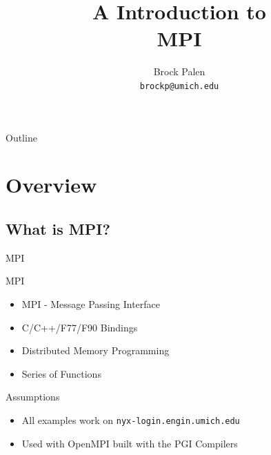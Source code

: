 \documentclass{beamer}
\title[CAC Intro] {A Introduction to\\ MPI}
\author{Brock Palen\\ \texttt{brockp@umich.edu}}
\begin{document}
  \begin{frame}
    \titlepage
  \end{frame}

  \begin{frame}{Outline}
    \tableofcontents
  \end{frame}
  
\section{Overview}
 \subsection {What is MPI?}

\begin{frame}{MPI}
 \begin{block}{MPI}
   \begin{itemize}
     \item MPI - Message Passing Interface
     \item C/C++/F77/F90 Bindings
     \item Distributed Memory Programming
     \item Series of Functions
   \end{itemize}
 \end{block}
   \begin{block}{Assumptions}
     \begin{itemize}
       \item All examples work on \texttt{nyx-login.engin.umich.edu}
       \item Used with OpenMPI built with the PGI Compilers
     \end{itemize}
   \end{block}
\end{frame}
\end{document}
